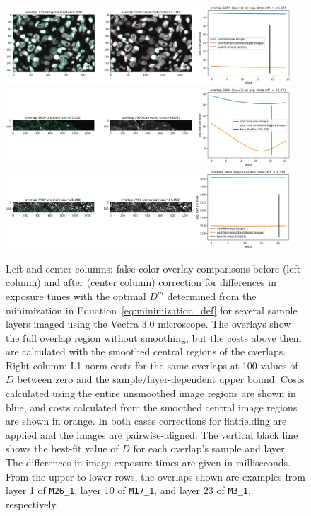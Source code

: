 \documentclass[letterpaper,11pt]{article}
\newcommand{\refeq}[1]{Equation~\ref{#1}}
\begin{document}
\begin{figure}[!ht]
\centering
\includegraphics[width=0.95\textwidth]{images/methods/cost_examples_vectra/overlay_comp_random_6761_offset=18.961}
\includegraphics[width=0.95\textwidth]{images/methods/cost_examples_vectra/overlay_comp_random_2425_offset=20.326}
\includegraphics[width=0.95\textwidth]{images/methods/cost_examples_vectra/overlay_comp_random_3946_offset=20.222}
\caption{\footnotesize Left and center columns: false color overlay comparisons before (left column) and after (center column) correction for differences in exposure times with the optimal $D^{m}$ determined from the minimization in \refeq{eq:minimization_def} for several sample layers imaged using the Vectra 3.0 microscope. The overlays show the full overlap region without smoothing, but the costs above them are calculated with the smoothed central regions of the overlaps. Right column: L1-norm costs for the same overlaps at 100 values of $D$ between zero and the sample/layer-dependent upper bound. Costs calculated using the entire unsmoothed image regions are shown in blue, and costs calculated from the smoothed central image regions are shown in orange. In both cases corrections for flatfielding are applied and the images are pairwise-aligned. The vertical black line shows the best-fit value of $D$ for each overlap's sample and layer. The differences in image exposure times are given in milliseconds. From the upper to lower rows, the overlaps shown are examples from layer 1 of \texttt{M26\_1}, layer 10 of \texttt{M17\_1}, and layer 23 of \texttt{M3\_1}, respectively.}
\label{fig:overlap_cost_examples_vectra_1}
\end{figure}
\end{document}
